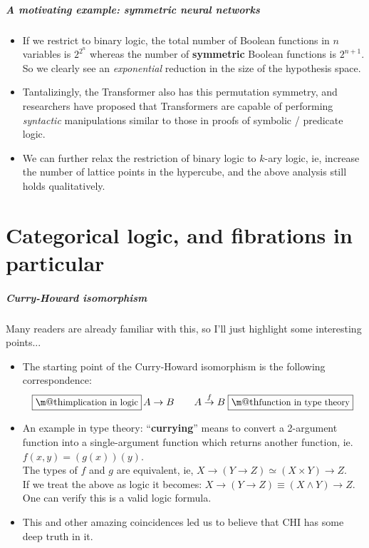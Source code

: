 \documentclass[16pt]{beamer}
\makeatletter
\renewcommand{\boxed}[1]{\fbox{\m@th$\displaystyle\scalebox{0.9}{#1}$} \,}
\makeatother
\begin{document}
\begin{frame}
	\frametitle{A motivating example: symmetric neural networks}
	\begin{itemize}
		\item If we restrict to binary logic, the total number of Boolean functions in $n$ variables is $2^{2^n}$ whereas the number of \textbf{symmetric} Boolean functions is $2^{n+1}$.  So we clearly see an \textit{exponential} reduction in the size of the hypothesis space.
		
		\item Tantalizingly, the Transformer also has this permutation symmetry, and researchers have proposed that Transformers are capable of performing \textit{syntactic} manipulations similar to those in proofs of symbolic / predicate logic.
		
		\item We can further relax the restriction of binary logic to $k$-ary logic, ie, increase the number of lattice points in the hypercube, and the above analysis still holds qualitatively.
	\end{itemize}
\end{frame}

\part{Categorical logic, and fibrations in particular}
\frame{\partpage}

\begin{frame}
\frametitle{Curry-Howard isomorphism}
Many readers are already familiar with this, so I'll just highlight some interesting points...
\begin{itemize}
	\item The starting point of the Curry-Howard isomorphism is the following correspondence:
	\begin{equation}
		\boxed{implication in logic} A \rightarrow B \qquad A \stackrel{f}{\rightarrow} B \; \boxed{function in type theory}
		\nonumber
	\end{equation}
	\item An example in type theory: ``\textbf{currying}'' means to convert a 2-argument function into a single-argument function which returns another function, ie. $f(x,y) = (g(x))(y)$.  \\
	The types of $f$ and $g$ are equivalent, ie, $X \rightarrow (Y \rightarrow Z) \simeq (X \times Y) \rightarrow Z$. \\
	If we treat the above as logic it becomes: $X \rightarrow (Y \rightarrow Z) \equiv (X \wedge Y) \rightarrow Z$.  One can verify this is a valid logic formula.
	\item This and other amazing coincidences led us to believe that CHI has some deep truth in it.
\end{itemize}
\end{frame}
\end{document}
